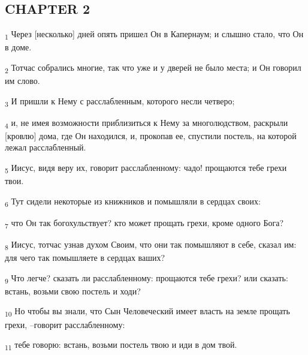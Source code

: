 \subsection{CHAPTER 2}
\begin{tcolorbox}
\textsubscript{1} Через [несколько] дней опять пришел Он в Капернаум; и слышно стало, что Он в доме.
\end{tcolorbox}
\begin{tcolorbox}
\textsubscript{2} Тотчас собрались многие, так что уже и у дверей не было места; и Он говорил им слово.
\end{tcolorbox}
\begin{tcolorbox}
\textsubscript{3} И пришли к Нему с расслабленным, которого несли четверо;
\end{tcolorbox}
\begin{tcolorbox}
\textsubscript{4} и, не имея возможности приблизиться к Нему за многолюдством, раскрыли [кровлю] дома, где Он находился, и, прокопав ее, спустили постель, на которой лежал расслабленный.
\end{tcolorbox}
\begin{tcolorbox}
\textsubscript{5} Иисус, видя веру их, говорит расслабленному: чадо! прощаются тебе грехи твои.
\end{tcolorbox}
\begin{tcolorbox}
\textsubscript{6} Тут сидели некоторые из книжников и помышляли в сердцах своих:
\end{tcolorbox}
\begin{tcolorbox}
\textsubscript{7} что Он так богохульствует? кто может прощать грехи, кроме одного Бога?
\end{tcolorbox}
\begin{tcolorbox}
\textsubscript{8} Иисус, тотчас узнав духом Своим, что они так помышляют в себе, сказал им: для чего так помышляете в сердцах ваших?
\end{tcolorbox}
\begin{tcolorbox}
\textsubscript{9} Что легче? сказать ли расслабленному: прощаются тебе грехи? или сказать: встань, возьми свою постель и ходи?
\end{tcolorbox}
\begin{tcolorbox}
\textsubscript{10} Но чтобы вы знали, что Сын Человеческий имеет власть на земле прощать грехи, --говорит расслабленному:
\end{tcolorbox}
\begin{tcolorbox}
\textsubscript{11} тебе говорю: встань, возьми постель твою и иди в дом твой.
\end{tcolorbox}
